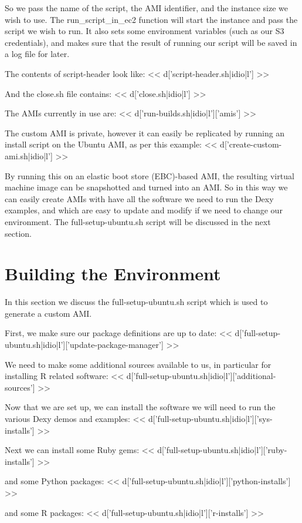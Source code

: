 \documentclass{tufte-handout}
\begin{document}
So we pass the name of the script, the AMI identifier, and the instance size we wish to use. The run\_script\_in\_ec2 function will start the instance and pass the script we wish to run. It also sets some environment variables (such as our S3 credentials), and makes sure that the result of running our script will be saved in a log file for later.

The contents of script-header look like:
<< d['script-header.sh|idio|l'] >>

And the close.sh file contains:
<< d['close.sh|idio|l'] >>

The AMIs currently in use are:
<< d['run-builds.sh|idio|l']['amis'] >>

The custom AMI is private, however it can easily be replicated by running an install script on the Ubuntu AMI, as per this example:
<< d['create-custom-ami.sh|idio|l'] >>

By running this on an elastic boot store (EBC)-based AMI, the resulting virtual machine image can be snapshotted and turned into an AMI. So in this way we can easily create AMIs with have all the software we need to run the Dexy examples, and which are easy to update and modify if we need to change our environment. The full-setup-ubuntu.sh script will be discussed in the next section.

\section{Building the Environment}

In this section we discuss the full-setup-ubuntu.sh script which is used to generate a custom AMI.

First, we make sure our package definitions are up to date:
<< d['full-setup-ubuntu.sh|idio|l']['update-package-manager'] >>

We need to make some additional sources available to us, in particular for installing R related software:
<< d['full-setup-ubuntu.sh|idio|l']['additional-sources'] >>

Now that we are set up, we can install the software we will need to run the various Dexy demos and examples:
<< d['full-setup-ubuntu.sh|idio|l']['sys-installs'] >>

Next we can install some Ruby gems:
<< d['full-setup-ubuntu.sh|idio|l']['ruby-installs'] >>

and some Python packages:
<< d['full-setup-ubuntu.sh|idio|l']['python-installs'] >>

and some R packages:
<< d['full-setup-ubuntu.sh|idio|l']['r-installs'] >>
\end{document}
